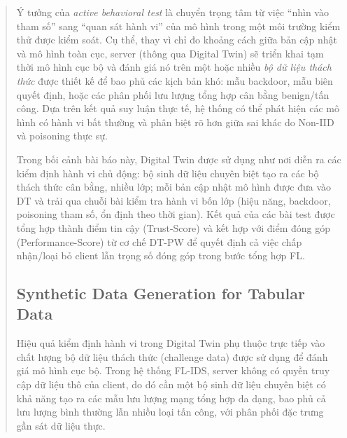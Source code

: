 \documentclass[runningheads]{llncs}
\begin{document}
\begin{abstract}
Ý tưởng của \emph{active behavioral test} là chuyển trọng tâm từ việc ``nhìn vào tham số'' sang ``quan sát hành vi'' của mô hình trong một môi trường kiểm thử được kiểm soát. Cụ thể, thay vì chỉ đo khoảng cách giữa bản cập nhật và mô hình toàn cục, server (thông qua Digital Twin) sẽ triển khai tạm thời mô hình cục bộ và đánh giá nó trên một hoặc nhiều \emph{bộ dữ liệu thách thức} được thiết kế để bao phủ các kịch bản khó: mẫu backdoor, mẫu biên quyết định, hoặc các phân phối lưu lượng tổng hợp cân bằng benign/tấn công. Dựa trên kết quả suy luận thực tế, hệ thống có thể phát hiện các mô hình có hành vi bất thường và phân biệt rõ hơn giữa sai khác do Non-IID và poisoning thực sự.

Trong bối cảnh bài báo này, Digital Twin được sử dụng như nơi diễn ra các kiểm định hành vi chủ động: bộ sinh dữ liệu chuyên biệt tạo ra các bộ thách thức cân bằng, nhiều lớp; mỗi bản cập nhật mô hình được đưa vào DT và trải qua chuỗi bài kiểm tra hành vi bốn lớp (hiệu năng, backdoor, poisoning tham số, ổn định theo thời gian). Kết quả của các bài test được tổng hợp thành điểm tin cậy (Trust-Score) và kết hợp với điểm đóng góp (Performance-Score) từ cơ chế DT-PW để quyết định cả việc chấp nhận/loại bỏ client lẫn trọng số đóng góp trong bước tổng hợp FL.

\subsection{Synthetic Data Generation for Tabular Data}

Hiệu quả kiểm định hành vi trong Digital Twin phụ thuộc trực tiếp vào chất lượng bộ dữ liệu thách thức (challenge data) được sử dụng để đánh giá mô hình cục bộ. Trong hệ thống FL-IDS, server không có quyền truy cập dữ liệu thô của client, do đó cần một bộ sinh dữ liệu chuyên biệt có khả năng tạo ra các mẫu lưu lượng mạng tổng hợp đa dạng, bao phủ cả lưu lượng bình thường lẫn nhiều loại tấn công, với phân phối đặc trưng gần sát dữ liệu thực.


\end{abstract}
\end{document}
